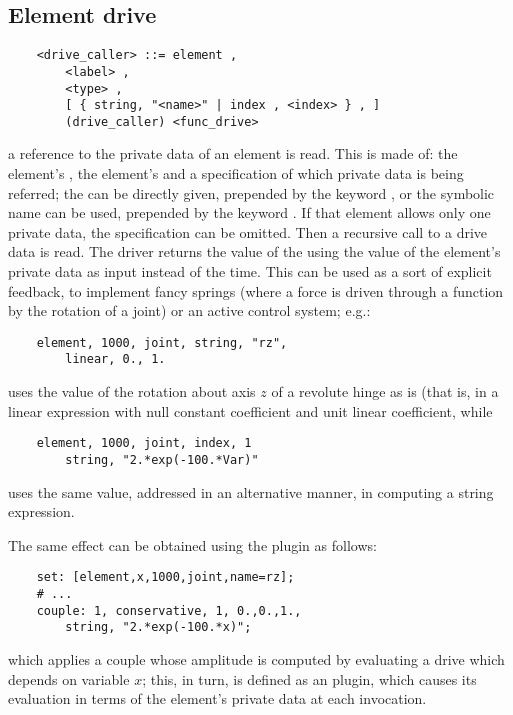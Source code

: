 \subsection{Element drive}\label{sec:DRIVE-ELEMENT}
\begin{verbatim}
    <drive_caller> ::= element ,
        <label> ,
        <type> ,
        [ { string, "<name>" | index , <index> } , ]
        (drive_caller) <func_drive>
\end{verbatim}
a reference to the private data of an element is read.
This is made of: the element's , the element's 
and a specification of which private data is being referred;
the  can be directly given, prepended by the keyword
, or the symbolic name can be used, prepended by 
the keyword .
If that element allows only one private data, the specification 
can be omitted.
Then a recursive call to a drive data is read. 
The driver returns the value of the  
 using the value of the 
element's private data as input instead of the time. 
This can be used as a sort of explicit feedback, to implement fancy
springs (where a force is driven through a function by the rotation
of a joint) or an active control system; e.g.:
\begin{verbatim}
    element, 1000, joint, string, "rz",
        linear, 0., 1.
\end{verbatim}
uses the value of the rotation about axis $z$ of a revolute hinge
as is (that is, in a linear expression with null constant coefficient 
and unit linear coefficient, while
\begin{verbatim}
    element, 1000, joint, index, 1
        string, "2.*exp(-100.*Var)"
\end{verbatim}
uses the same value, addressed in an alternative manner, in computing
a string expression.

\noindent
The same effect can be obtained using the  plugin as follows:
\begin{verbatim}
    set: [element,x,1000,joint,name=rz];
    # ...
    couple: 1, conservative, 1, 0.,0.,1.,
        string, "2.*exp(-100.*x)";
\end{verbatim}
which applies a couple whose amplitude is computed by evaluating
a  drive which depends on variable $x$; this, in turn,
is defined as an  plugin, which causes its evaluation
in terms of the element's private data at each invocation.

